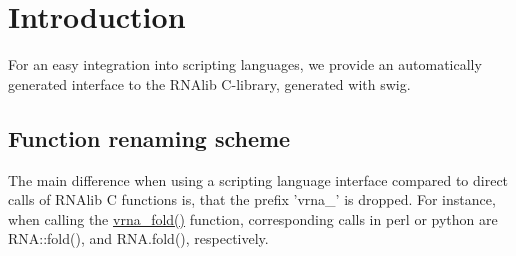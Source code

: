 \hypertarget{swig_interface_swig_intro}{}\section{Introduction}\label{swig_interface_swig_intro}
For an easy integration into scripting languages, we provide an automatically generated interface to the R\+N\+Alib C-\/library, generated with swig.\hypertarget{swig_interface_swig_renaming}{}\subsection{Function renaming scheme}\label{swig_interface_swig_renaming}
The main difference when using a scripting language interface compared to direct calls of R\+N\+Alib C functions is, that the prefix 'vrna\+\_\+' is dropped. For instance, when calling the \hyperlink{group__mfe__fold__single_gae7ca49ffb3086f145da36c964a7cec64}{vrna\+\_\+fold()} function, corresponding calls in perl or python are R\+N\+A\+::fold(), and R\+N\+A.\+fold(), respectively.

